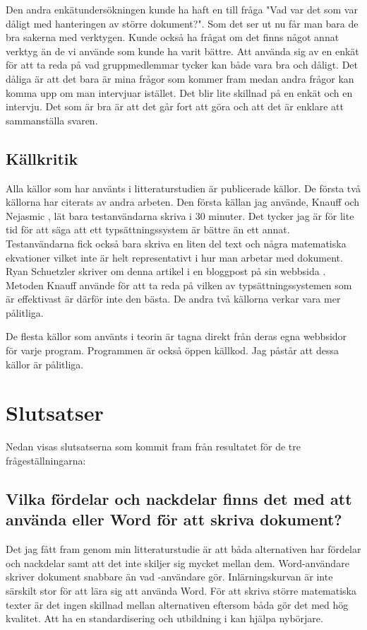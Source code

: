 Den andra enkätundersökningen kunde ha haft en till fråga "Vad var det som var dåligt med hanteringen av större dokument?". Som det ser ut nu får man bara de bra sakerna med verktygen. Kunde också ha frågat om det finns något annat verktyg än de vi använde som kunde ha varit bättre. Att använda sig av en enkät för att ta reda på vad gruppmedlemmar tycker kan både vara bra och dåligt. Det dåliga är att det bara är mina frågor som kommer fram medan andra frågor kan komma upp om man intervjuar istället. Det blir lite skillnad på en enkät och en intervju. Det som är bra är att det går fort att göra och att det är enklare att sammanställa svaren.

\subsection{Källkritik}
Alla källor som har använts i litteraturstudien är publicerade källor. De första två källorna har citerats av andra arbeten. Den första källan jag använde, Knauff och Nejasmic \cite{knauff2014efficiency}, lät bara testanvändarna skriva i 30 minuter. Det tycker jag är för lite tid för att säga att ett typsättningssystem är bättre än ett annat. Testanvändarna fick också bara skriva en liten del text och några matematiska ekvationer vilket inte är helt representativt i hur man arbetar med dokument. Ryan Schuetzler skriver om denna artikel i en bloggpost på sin webbsida \cite{ryan_sch}. Metoden Knauff använde för att ta reda på vilken av typsättningssystemen som är effektivast är därför inte den bästa. De andra två källorna verkar vara mer pålitliga.

De flesta källor som använts i teorin är tagna direkt från deras egna webbsidor för varje program. Programmen är också öppen källkod. Jag påstår att dessa källor är pålitliga.

\section{Slutsatser}
\label{sec:conclusions-tuhkala}
Nedan visas slutsatserna som kommit fram från resultatet för de tre frågeställningarna:

\subsection{Vilka fördelar och nackdelar finns det med att använda \latex eller Word för att skriva dokument?}
Det jag fått fram genom min litteraturstudie är att båda alternativen har fördelar och nackdelar samt att det inte skiljer sig mycket mellan dem. Word-användare skriver dokument snabbare än vad \latex-användare gör. Inlärningskurvan är inte särskilt stor för att lära sig att använda Word. För att skriva större matematiska texter är det ingen skillnad mellan alternativen eftersom båda gör det med hög kvalitet. Att ha en standardisering och utbildning i \latex kan hjälpa nybörjare.


